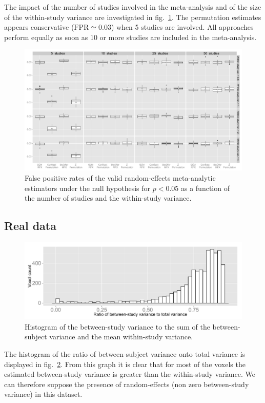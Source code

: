 \documentclass{llncs}
\begin{document}
The impact of the number of studies involved in the meta-analysis and of the size of the within-study variance are investigated in fig.~\ref{fig_fpr_valid}. The permutation estimates appears conservative ($\text{FPR}\simeq 0.03$) when 5 studies are involved. All approaches perform equally as soon as 10 or more studies are included in the meta-analysis. 
\begin{figure}[ht]
	\centering
	\includegraphics[width=\linewidth]{./Rplot_valids.pdf}
	\caption{False positive rates of the valid random-effects meta-analytic estimators under the null hypothesis for $p<0.05$ as a function of the number of studies and the within-study variance.}
	\label{fig_fpr_valid}
\end{figure}


\subsection{Real data}

\begin{figure}[ht]
	\centering
	\includegraphics[width=0.7\linewidth]{./Rplot_ratio_variances.pdf}
	\caption{Histogram of the between-study variance to the sum of the between-subject variance and the mean within-study variance.}
	\label{fig_realdata_variances}
\end{figure}

The histogram of the ratio of between-subject variance onto total variance is displayed in fig.~\ref{fig_realdata_variances}. From this graph it is clear that for most of the voxels the estimated between-study variance is greater than the within-study variance. We can therefore suppose the presence of random-effects (non zero between-study variance) in this dataset.
\end{document}
